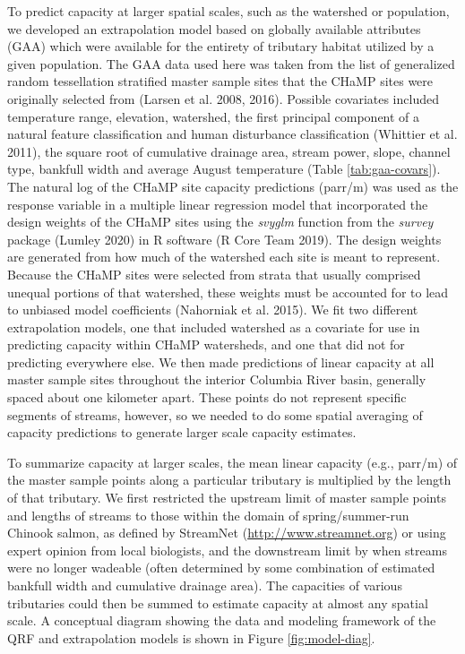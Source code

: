 \documentclass[
  12pt,
]{article}
\begin{document}
To predict capacity at larger spatial scales, such as the watershed or population, we developed an extrapolation model based on globally available attributes (GAA) which were available for the entirety of tributary habitat utilized by a given population. The GAA data used here was taken from the list of generalized random tessellation stratified master sample sites that the CHaMP sites were originally selected from (Larsen et al. 2008, 2016). Possible covariates included temperature range, elevation, watershed, the first principal component of a natural feature classification and human disturbance classification (Whittier et al. 2011), the square root of cumulative drainage area, stream power, slope, channel type, bankfull width and average August temperature (Table \ref{tab:gaa-covars}). The natural log of the CHaMP site capacity predictions (parr/m) was used as the response variable in a multiple linear regression model that incorporated the design weights of the CHaMP sites using the \emph{svyglm} function from the \emph{survey} package (Lumley 2020) in R software (R Core Team 2019). The design weights are generated from how much of the watershed each site is meant to represent. Because the CHaMP sites were selected from strata that usually comprised unequal portions of that watershed, these weights must be accounted for to lead to unbiased model coefficients (Nahorniak et al. 2015). We fit two different extrapolation models, one that included watershed as a covariate for use in predicting capacity within CHaMP watersheds, and one that did not for predicting everywhere else. We then made predictions of linear capacity at all master sample sites throughout the interior Columbia River basin, generally spaced about one kilometer apart. These points do not represent specific segments of streams, however, so we needed to do some spatial averaging of capacity predictions to generate larger scale capacity estimates.

To summarize capacity at larger scales, the mean linear capacity (e.g., parr/m) of the master sample points along a particular tributary is multiplied by the length of that tributary. We first restricted the upstream limit of master sample points and lengths of streams to those within the domain of spring/summer-run Chinook salmon, as defined by StreamNet (\url{http://www.streamnet.org}) or using expert opinion from local biologists, and the downstream limit by when streams were no longer wadeable (often determined by some combination of estimated bankfull width and cumulative drainage area). The capacities of various tributaries could then be summed to estimate capacity at almost any spatial scale. A conceptual diagram showing the data and modeling framework of the QRF and extrapolation models is shown in Figure \ref{fig:model-diag}.
\end{document}
